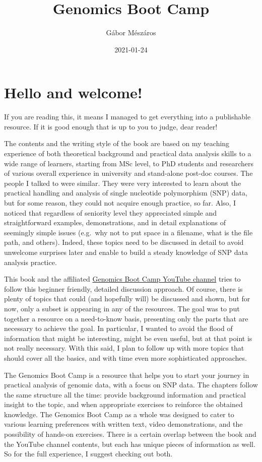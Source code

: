 \documentclass[]{book}
\title{Genomics Boot Camp}
\author{Gábor Mészáros}
\date{2021-01-24}
\begin{document}
\maketitle

{
\setcounter{tocdepth}{1}
\tableofcontents
}
\chapter{Hello and welcome!}\label{hello-and-welcome}

If you are reading this, it means I managed to get everything into a
publishable resource. If it is good enough that is up to you to judge,
dear reader!

The contents and the writing style of the book are based on my teaching
experience of both theoretical background and practical data analysis
skills to a wide range of learners, starting from MSc level, to PhD
students and researchers of various overall experience in university and
stand-alone post-doc courses. The people I talked to were similar. They
were very interested to learn about the practical handling and analysis
of single nucleotide polymorphism (SNP) data, but for some reason, they
could not acquire enough practice, so far. Also, I noticed that
regardless of seniority level they appreciated simple and
straightforward examples, demonstrations, and in detail explanations of
seemingly simple issues (e.g.~why not to put space in a filename, what
is the file path, and others). Indeed, these topics need to be discussed
in detail to avoid unwelcome surprises later and enable to build a
steady knowledge of SNP data analysis practice.

This book and the affiliated
\href{https://www.youtube.com/channel/UCXuX-kQ1TbKHWeB75NgmhlA}{Genomics
Boot Camp YouTube channel} tries to follow this beginner friendly,
detailed discussion approach. Of course, there is plenty of topics that
could (and hopefully will) be discussed and shown, but for now, only a
subset is appearing in any of the resources. The goal was to put
together a resource on a need-to-know basis, presenting only the parts
that are necessary to achieve the goal. In particular, I wanted to avoid
the flood of information that might be interesting, might be even
useful, but at that point is not really necessary. With this said, I
plan to follow up with more topics that should cover all the basics, and
with time even more sophisticated approaches.

The Genomics Boot Camp is a resource that helps you to start your
journey in practical analysis of genomic data, with a focus on SNP data.
The chapters follow the same structure all the time: provide background
information and practical insight to the topic, and when appropriate
exercises to reinforce the obtained knowledge. The Genomics Boot Camp as
a whole was designed to cater to various learning preferences with
written text, video demonstrations, and the possibility of hands-on
exercises. There is a certain overlap between the book and the YouTube
channel contents, but each has unique pieces of information as well. So
for the full experience, I suggest checking out both.
\end{document}
